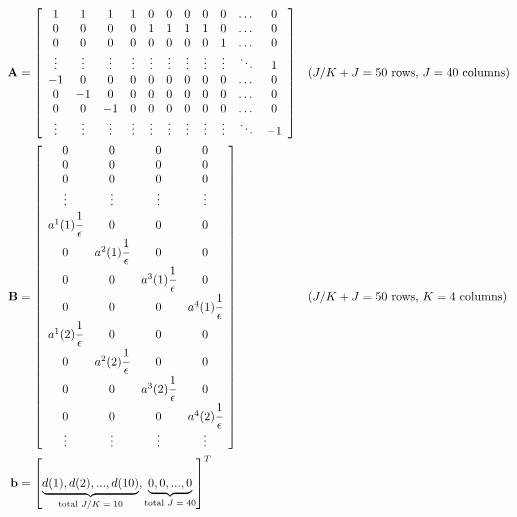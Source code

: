 \documentclass[fleqn,10pt]{wlscirep}
\begin{document}
\begin{align}
    \mathbf{A} &= \left[\begin{array}{ccccccccccc}
        1 & 1 & 1 & 1 & 0 & 0 & 0 & 0 & 0 & \dots & 0 \\
        0 & 0 & 0 & 0 & 1 & 1 & 1 & 1 & 0 & \dots & 0 \\
        0 & 0 & 0 & 0 & 0 & 0 & 0 & 0 & 1 & \dots & 0 \\
        \vdots & \vdots & \vdots & \vdots & \vdots & \vdots & \vdots & \vdots & \vdots & \ddots & 1 \\
        -1 & 0 & 0 & 0 & 0 & 0 & 0 & 0 & 0 & \dots & 0 \\
        0 & -1 & 0 & 0 & 0 & 0 & 0 & 0 & 0 & \dots & 0 \\
        0 & 0 & -1 & 0 & 0 & 0 & 0 & 0 & 0 & \dots & 0 \\
        \vdots & \vdots & \vdots & \vdots & \vdots & \vdots & \vdots & \vdots & \vdots & \ddots & -1 \\
    \end{array} \right] && \text{($J/K + J = 50$ rows, $J = 40$ columns)} \\
    \mathbf{B} &= \left[\begin{array}{cccc}
        0 & 0 & 0 & 0 \\
        0 & 0 & 0 & 0 \\
        0 & 0 & 0 & 0 \\
        \vdots & \vdots & \vdots & \vdots \\
        a^1(1) \cfrac{1}{\epsilon} & 0 & 0 & 0 \\
        0 & a^2(1) \cfrac{1}{\epsilon} & 0 & 0 \\
        0 & 0 & a^3(1) \cfrac{1}{\epsilon} & 0 \\
        0 & 0 & 0 & a^4(1) \cfrac{1}{\epsilon} \\
        a^1(2) \cfrac{1}{\epsilon} & 0 & 0 & 0 \\
        0 & a^2(2) \cfrac{1}{\epsilon} & 0 & 0 \\
        0 & 0 & a^3(2) \cfrac{1}{\epsilon} & 0 \\
        0 & 0 & 0 & a^4(2) \cfrac{1}{\epsilon} \\
        \vdots & \vdots & \vdots & \vdots \\
    \end{array} \right] && \text{($J/K + J = 50$ rows, $K = 4$ columns)} \\
    \mathbf{b} &= \left[\underbrace{d(1), d(2), ..., d(10)}_{\text{total $J/K = 10$}}, \underbrace{0, 0, ..., 0}_{\text{total $J = 40$}} \right]^{T}
\end{align}
\end{document}
